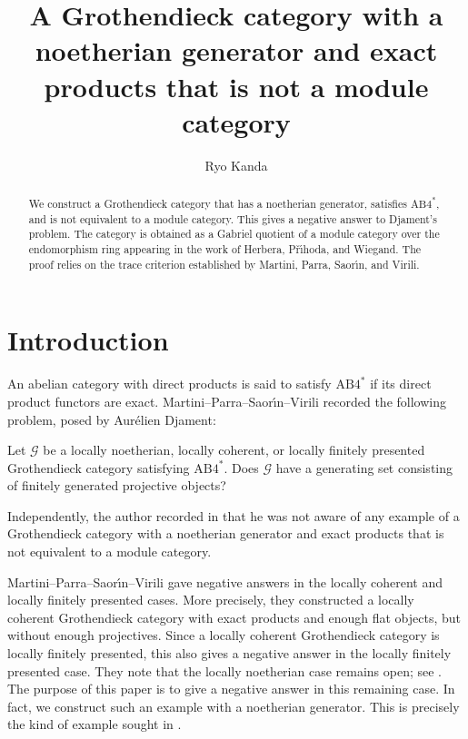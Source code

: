 \documentclass[a4paper,10pt,reqno]{amsart}
\title[A Grothendieck category with a noetherian generator and $\ABfourst$]{A Grothendieck category with a noetherian generator and exact products that is not a module category}
\author{Ryo Kanda}
\theoremstyle{definition}
\theoremstyle{plain}
\numberwithin{equation}{section}
\newcommand{\cG}{\mathcal{G}}
\newcommand{\ABfourst}{\mathrm{AB4}^{\ast}}
\begin{document}
\begin{abstract}
We construct a Grothendieck category that has a noetherian generator, satisfies $\ABfourst$, and is not equivalent to a module category. This gives a negative answer to Djament's problem. The category is obtained as a Gabriel quotient of a module category over the endomorphism ring appearing in the work of Herbera, P\v{r}\'{\i}hoda, and Wiegand. The proof relies on the trace criterion established by Martini, Parra, Saor\'{\i}n, and Virili.
\end{abstract}

\maketitle

\section{Introduction}
\label{58310472}

An abelian category with direct products is said to satisfy $\ABfourst$ if its direct product functors are exact. Martini--Parra--Saor\'{\i}n--Virili recorded the following problem, posed by Aur\'elien Djament:

\begin{problem}\label{94627138}
Let $\cG$ be a locally noetherian, locally coherent, or locally finitely presented Grothendieck category satisfying $\ABfourst$. Does $\cG$ have a generating set consisting of finitely generated projective objects?
\end{problem}

Independently, the author recorded in \cite[Remark~7.15]{MR4342508} that he was not aware of any example of a Grothendieck category with a noetherian generator and exact products that is not equivalent to a module category.

Martini--Parra--Saor\'{\i}n--Virili \cite[Theorem~5.14 and Proposition~5.15; see also Remark~5.16(4)]{arXiv:2508.00670v2} gave negative answers in the locally coherent and locally finitely presented cases. More precisely, they constructed a locally coherent Grothendieck category with exact products and enough flat objects, but without enough projectives. Since a locally coherent Grothendieck category is locally finitely presented, this also gives a negative answer in the locally finitely presented case. They note that the locally noetherian case remains open; see \cite[Introduction]{arXiv:2508.00670v2}. The purpose of this paper is to give a negative answer in this remaining case. In fact, we construct such an example with a noetherian generator. This is precisely the kind of example sought in \cite[Remark~7.15]{MR4342508}.
\end{document}
